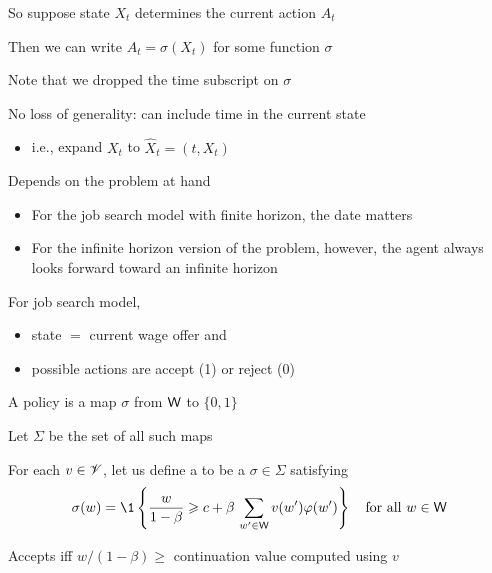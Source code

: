 \begin{frame}
    
    So suppose state $X_t$ determines the current action $A_t$

    Then we can write $A_t = \sigma(X_t)$ for some function $\sigma$

    Note that we dropped the time subscript on $\sigma$

    No loss of generality: can include time in the current state 
    \begin{itemize}
        \item i.e., expand $X_t$ to $\hat X_t = (t, X_t)$
    \end{itemize}

    Depends on the problem at hand
    \begin{itemize}
        \item For the job search model with finite horizon, the date matters
        \item For the infinite horizon version of the problem, however, the
            agent always looks forward toward an infinite horizon
    \end{itemize}

\end{frame}


\begin{frame}
    
    For job search model, 
    \begin{itemize}
        \item state $=$ current wage offer and 
        \item possible actions are accept (1) or reject (0)
    \end{itemize}

    A policy is a map $\sigma$ from $\mathsf W$ to $\{0,1\}$

    Let $\Sigma$ be the set of all such maps

    For each $v \in \mathscr V$, let us define a  to be a $\sigma \in \Sigma$ satisfying
    \begin{equation*}
        \sigma(w) 
        = \1
        \left\{
            \frac{w}{1-\beta}
            \geq
            c + \beta \, \sum_{w' \in \Wsf} v(w') \phi(w')
        \right\}
        \quad \text{for all } w \in \Wsf
    \end{equation*}

    Accepts iff $w/(1-\beta) \geq$ continuation value computed
    using $v$ 

\end{frame}


